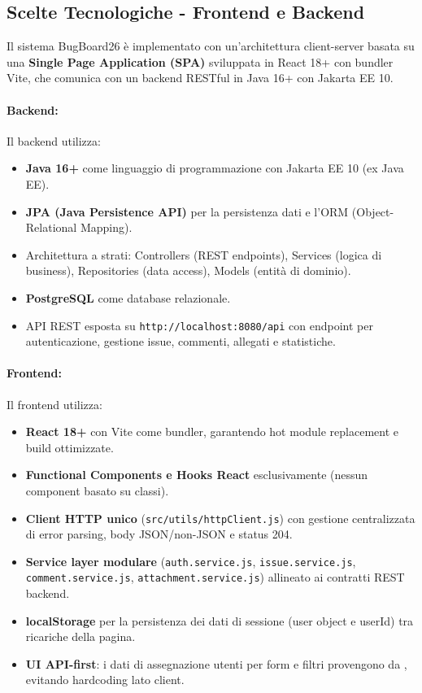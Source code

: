 ﻿\documentclass[11pt,a4paper]{article}
\newcommand{\code}[1]{\texttt{\seqsplit{#1}}}
\begin{document}
\subsection{Scelte Tecnologiche - Frontend e Backend}

Il sistema BugBoard26 è implementato con un'architettura client-server basata su una \textbf{Single Page Application (SPA)} sviluppata in React 18+ con bundler Vite, che comunica con un backend RESTful in Java 16+ con Jakarta EE 10.

\paragraph{Backend:}
Il backend utilizza:
\begin{itemize}
    \item \textbf{Java 16+} come linguaggio di programmazione con Jakarta EE 10 (ex Java EE).
    \item \textbf{JPA (Java Persistence API)} per la persistenza dati e l'ORM (Object-Relational Mapping).
    \item Architettura a strati: Controllers (REST endpoints), Services (logica di business), Repositories (data access), Models (entità di dominio).
    \item \textbf{PostgreSQL} come database relazionale.
    \item API REST esposta su \texttt{http://localhost:8080/api} con endpoint per autenticazione, gestione issue, commenti, allegati e statistiche.
\end{itemize}

\paragraph{Frontend:}
Il frontend utilizza:
\begin{itemize}
    \item \textbf{React 18+} con Vite come bundler, garantendo hot module replacement e build ottimizzate.
    \item \textbf{Functional Components e Hooks React} esclusivamente (nessun component basato su classi).
    \item \textbf{Client HTTP unico} (\texttt{src/utils/httpClient.js}) con gestione centralizzata di error parsing, body JSON/non-JSON e status 204.
    \item \textbf{Service layer modulare} (\texttt{auth.service.js}, \texttt{issue.service.js}, \texttt{comment.service.js}, \texttt{attachment.service.js}) allineato ai contratti REST backend.
    \item \textbf{localStorage} per la persistenza dei dati di sessione (user object e userId) tra ricariche della pagina.
    \item \textbf{UI API-first}: i dati di assegnazione utenti per form e filtri provengono da \code{GET /auth/users/assignable}, evitando hardcoding lato client.
\end{itemize}
\end{document}
